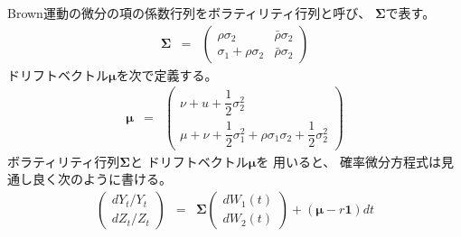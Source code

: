 \documentclass[uplatex,a4j,12pt,dvipdfmx]{jsarticle}
\begin{document}
Brown運動の微分の項の係数行列をボラティリティ行列と呼び、
${\bm \Sigma}$で表す。
%
%
\begin{eqnarray}
	{\bm \Sigma}
	&=&
	\left(
	\begin{array}{cc}
			\rho \sigma_{2}              & \bar{\rho} \sigma_{2}
			\\
			\sigma_{1} + \rho \sigma_{2} & \bar{\rho} \sigma_{2}
		\end{array}
	\right)
\end{eqnarray}
%
%
ドリフトベクトル${\bm \mu}$を次で定義する。
%
%
\begin{eqnarray}
	{\bm \mu}
	&=&
	\left(
	\begin{array}{c}
			\nu + u + \dfrac{1}{2} \sigma_{2}^{2}
			\\
			\mu + \nu + \dfrac{1}{2} \sigma_{1}^{2} + \rho \sigma_{1} \sigma_{2} + \dfrac{1}{2} \sigma_{2}^{2}
		\end{array}
	\right)
\end{eqnarray}
%
%
ボラティリティ行列${\bm \Sigma}$と
ドリフトベクトル${\bm \mu}$を
用いると、
確率微分方程式は見通し良く次のように書ける。
%
%
\begin{eqnarray}
	\left(
	\begin{array}{c}
			d Y_{t} / Y_{t}
			\\
			d Z_{t} / Z_{t}
		\end{array}
	\right)
	&=&
	{\bm \Sigma}
	\left(
	\begin{array}{c}
			dW_{1}(t)
			\\
			dW_{2}(t)
		\end{array}
	\right)
	+
	( {\bm \mu} - r {\bm 1} ) dt
\end{eqnarray}
%
%
\end{document}
